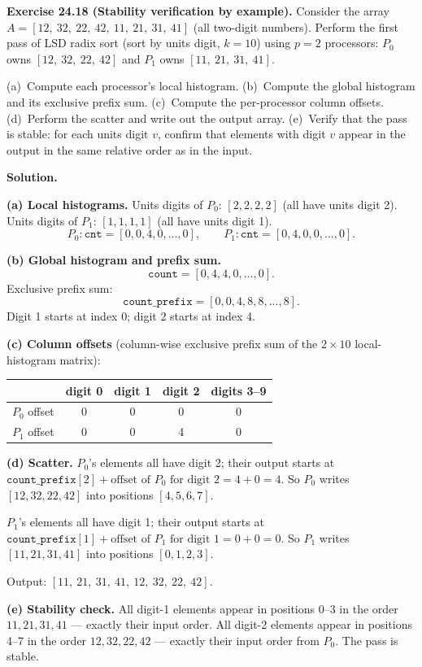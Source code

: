 \begin{ppexercises}
\textbf{Exercise 24.18 (Stability verification by example).}
Consider the array $A = [12,\ 32,\ 22,\ 42,\ 11,\ 21,\ 31,\ 41]$
(all two-digit numbers). Perform the first pass of LSD radix sort
(sort by units digit, $k = 10$) using $p = 2$ processors:
$P_0$ owns $[12,\ 32,\ 22,\ 42]$ and $P_1$ owns $[11,\ 21,\ 31,\ 41]$.

(a)~Compute each processor's local histogram.
(b)~Compute the global histogram and its exclusive prefix sum.
(c)~Compute the per-processor column offsets.
(d)~Perform the scatter and write out the output array.
(e)~Verify that the pass is stable: for each units digit $v$, confirm
that elements with digit $v$ appear in the output in the same relative
order as in the input.

\medskip
\textbf{Solution.}

\textbf{(a) Local histograms.} Units digits of $P_0$: $[2, 2, 2, 2]$
(all have units digit 2). Units digits of $P_1$: $[1, 1, 1, 1]$
(all have units digit 1).
\[
P_0: \texttt{cnt} = [0,0,4,0,\ldots,0], \qquad
P_1: \texttt{cnt} = [0,4,0,0,\ldots,0].
\]

\textbf{(b) Global histogram and prefix sum.}
\[
\texttt{count} = [0,4,4,0,\ldots,0].
\]
Exclusive prefix sum:
\[
\texttt{count\_prefix} = [0,0,4,8,8,\ldots,8].
\]
Digit 1 starts at index 0; digit 2 starts at index 4.

\textbf{(c) Column offsets} (column-wise exclusive prefix sum of the
$2 \times 10$ local-histogram matrix):
\begin{center}
\begin{tabular}{c|cccc}
\toprule
& digit 0 & digit 1 & digit 2 & digits 3--9 \\
\midrule
$P_0$ offset & 0 & 0 & 0 & 0 \\
$P_1$ offset & 0 & 0 & 4 & 0 \\
\bottomrule
\end{tabular}
\end{center}

\textbf{(d) Scatter.}
$P_0$'s elements all have digit 2; their output starts at
$\texttt{count\_prefix}[2] + \text{offset of } P_0 \text{ for digit 2}
= 4 + 0 = 4$.
So $P_0$ writes $[12, 32, 22, 42]$ into positions $[4, 5, 6, 7]$.

$P_1$'s elements all have digit 1; their output starts at
$\texttt{count\_prefix}[1] + \text{offset of } P_1 \text{ for digit 1}
= 0 + 0 = 0$.
So $P_1$ writes $[11, 21, 31, 41]$ into positions $[0, 1, 2, 3]$.

Output: $[11,\ 21,\ 31,\ 41,\ 12,\ 32,\ 22,\ 42]$.

\textbf{(e) Stability check.} All digit-1 elements appear in positions
0--3 in the order $11, 21, 31, 41$ --- exactly their input order.
All digit-2 elements appear in positions 4--7 in the order
$12, 32, 22, 42$ --- exactly their input order from $P_0$. The pass is
stable. \checkmark
\end{ppexercises}

